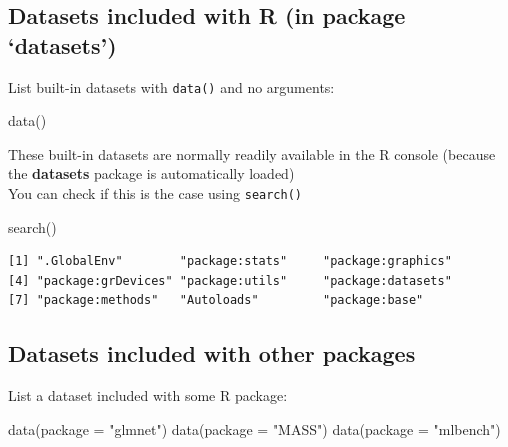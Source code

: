 \documentclass[
]{book}
\newenvironment{Shaded}{\begin{snugshade}}{\end{snugshade}}
\newcommand{\AttributeTok}[1]{\textcolor[rgb]{0.77,0.63,0.00}{#1}}
\newcommand{\FunctionTok}[1]{\textcolor[rgb]{0.00,0.00,0.00}{#1}}
\newcommand{\NormalTok}[1]{#1}
\newcommand{\StringTok}[1]{\textcolor[rgb]{0.31,0.60,0.02}{#1}}
\begin{document}
\hypertarget{datasets-included-with-r-in-package-datasets}{%
\subsection{Datasets included with R (in package `datasets')}\label{datasets-included-with-r-in-package-datasets}}

List built-in datasets with \texttt{data()} and no arguments:

\begin{Shaded}
\begin{Highlighting}[]
\FunctionTok{data}\NormalTok{()}
\end{Highlighting}
\end{Shaded}

These built-in datasets are normally readily available in the R console (because the \textbf{datasets} package is automatically loaded)\\
You can check if this is the case using \texttt{search()}

\begin{Shaded}
\begin{Highlighting}[]
\FunctionTok{search}\NormalTok{()}
\end{Highlighting}
\end{Shaded}

\begin{verbatim}
[1] ".GlobalEnv"        "package:stats"     "package:graphics" 
[4] "package:grDevices" "package:utils"     "package:datasets" 
[7] "package:methods"   "Autoloads"         "package:base"     
\end{verbatim}

\hypertarget{datasets-included-with-other-packages}{%
\subsection{Datasets included with other packages}\label{datasets-included-with-other-packages}}

List a dataset included with some R package:

\begin{Shaded}
\begin{Highlighting}[]
\FunctionTok{data}\NormalTok{(}\AttributeTok{package =} \StringTok{"glmnet"}\NormalTok{)}
\FunctionTok{data}\NormalTok{(}\AttributeTok{package =} \StringTok{"MASS"}\NormalTok{)}
\FunctionTok{data}\NormalTok{(}\AttributeTok{package =} \StringTok{"mlbench"}\NormalTok{)}
\end{Highlighting}
\end{Shaded}
\end{document}
